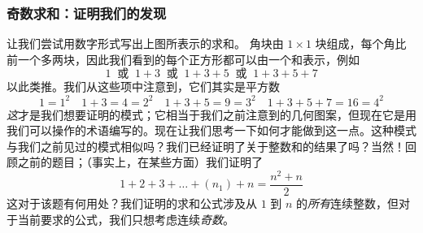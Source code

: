 \subsubsection*{奇数求和：证明我们的发现}

让我们尝试用数字形式写出上图所表示的求和。 角块由 $1 \times 1$ 块组成，每个角比前一个多两块，因此我们看到的每个正方形都可以由一个和表示，例如
\[1 \:\text{ 或 }\: 1+3 \:\text{ 或 }\: 1+3+5 \:\text{ 或 }\: 1+3+5+7 \]
以此类推。我们从这些项中注意到，它们其实是平方数
\[1=1^2 \quad 1+3=4=2^2 \quad 1+3+5=9=3^2 \quad 1+3+5+7=16=4^2 \]
\emph{这}才是我们想要证明的模式；它相当于我们之前注意到的几何图案，但现在它是用我们可以操作的术语编写的。现在让我们思考一下如何才能做到这一点。这种模式与我们之前见过的模式相似吗？我们已经证明了关于整数和的结果了吗？当然！回顾之前的题目；（事实上，在某些方面）我们证明了
\[1 + 2 + 3 + \dots + (n_1) + n =\frac{n^2 + n}{2}\]
这对于该题有何用处？我们证明的求和公式涉及从 $1$ 到 $n$ 的\emph{所有}连续整数，但对于当前要求的公式，我们只想考虑连续\emph{奇数}。


